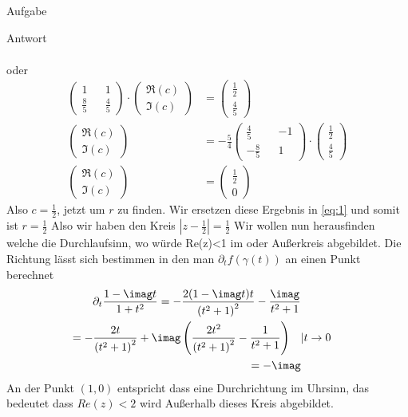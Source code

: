 \documentclass{scrartcl}
\let\*\cdot
\begin{document}
\begin{section}{Aufgabe}
\begin{subsection}{Antwort}
\begin{itemize}
\begin{align*}
\end{align*}
oder
\begin{align*}
    \begin{pmatrix}
    1&&1\\\frac{8}{5}&&\frac{4}{5}
\end{pmatrix}\*\begin{pmatrix}
    \Re(c)\\\Im(c)
\end{pmatrix}&=\begin{pmatrix}
    \frac{1}{2}\\\frac{4}{5}
\end{pmatrix}\\
  \begin{pmatrix}
    \Re(c)\\\Im(c)
\end{pmatrix}&=-\frac{5}{4}\begin{pmatrix}
    \frac{4}{5}&&-1\\
    -\frac{8}{5}&&1
\end{pmatrix}\*\begin{pmatrix}
    \frac{1}{2}\\\frac{4}{5}
\end{pmatrix}\\
\begin{pmatrix}
    \Re(c)\\\Im(c)
\end{pmatrix}&=\begin{pmatrix}
    \frac{1}{2}\\0
\end{pmatrix}
\end{align*}
Also $c=\frac{1}{2}$, jetzt um $r$ zu finden. Wir ersetzen diese Ergebnis in \eqref{eq:1} und somit ist $r=\frac{1}{2}$
Also wir haben den Kreis $\left|z-\frac{1}{2}\right|=\frac{1}{2}$
Wir wollen nun herausfinden welche die Durchlaufsinn, wo würde Re(z)<1 im oder Außerkreis abgebildet. Die Richtung lässt sich bestimmen in den man $\partial_t f(\gamma(t))$ an einen Punkt berechnet
\begin{align*}
        \partial_t \frac{1-\imag t}{1+t^2}
=-\frac{2 (1-\imag t) t}{\left(t^2+1\right)^2}-\frac{\imag}{t^2+1}\\
=-\frac{2 t}{\left(t^2+1\right)^2}+\imag \left(\frac{2
   t^2}{\left(t^2+1\right)^2}-\frac{1}{t^2+1}\right)\quad &|t\rightarrow 0\\
   =-\imag
\end{align*}
An der Punkt $(1,0)$ entspricht dass eine Durchrichtung im Uhrsinn, das bedeutet dass $Re(z)<2$ wird Außerhalb dieses Kreis abgebildet.\\

\end{itemize}
\end{subsection}
\end{section}
\end{document}

